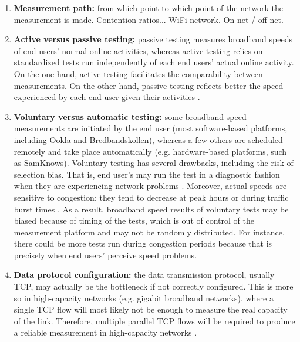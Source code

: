 \documentclass[12pt]{article}
\begin{document}
\begin{enumerate}[label=\textbf{\arabic* --}]
	\item \textbf{Measurement path:} from which point to which point of the network the measurement is made. Contention ratios... WiFi network. On-net / off-net.

	\item \textbf{Active versus passive testing:} passive testing measures broadband speeds of end users' normal online activities, whereas active testing relies on standardized tests run independently of each end users' actual online activity. On the one hand, active testing facilitates the comparability between measurements. On the other hand, passive testing reflects better the speed experienced by each end user given their activities \citep{zuhyle2015}.

	\item \textbf{Voluntary versus automatic testing:} some broadband speed measurements are initiated by the end user (most software-based platforms, including Ookla and Bredbandskollen), whereas a few others are scheduled remotely and take place automatically (e.g. hardware-based platforms, such as SamKnows). Voluntary testing has several drawbacks, including the risk of selection bias. That is, end user's may run the test in a diagnostic fashion when they are experiencing network problems \citep{bauer2010}. Moreover, actual speeds are sensitive to congestion: they tend to decrease at peak hours or during traffic burst times \citep{sundaresan2012,zuhyle2015}. As a result, broadband speed results of voluntary tests may be biased because of timing of the tests, which is out of control of the measurement platform and may not be randomly distributed. For instance, there could be more tests run during congestion periods because that is precisely when end users' perceive speed problems.          
	 
	\item \textbf{Data protocol configuration:} the data transmission protocol, usually TCP, may actually be the bottleneck if not correctly configured. This is more so in high-capacity networks (e.g. gigabit broadband networks), where a single TCP flow will most likely not be enough to measure the real capacity of the link. Therefore, multiple parallel TCP flows will be required to produce a reliable measurement in high-capacity networks \citep{bauer2010,bauer2016}.
	

\end{enumerate}
\end{document}
